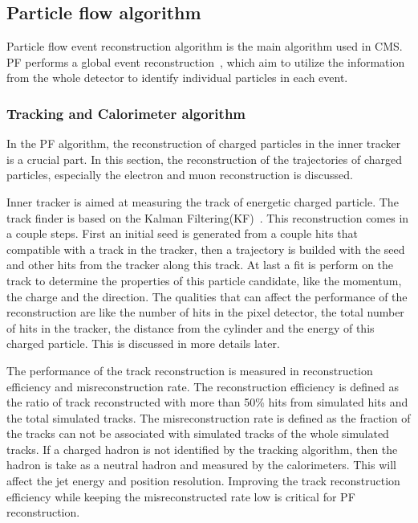 \subsection{Particle flow algorithm}

Particle flow event reconstruction algorithm is the main algorithm used in CMS. PF performs a global event reconstruction~\cite{CMS-PRF-14-001}, which aim to utilize the information from the whole detector to identify individual particles in each event.



\subsubsection{Tracking and Calorimeter algorithm}\label{PFtracker}

In the PF algorithm, the reconstruction of charged particles in the inner tracker is a crucial part. In this section, the reconstruction of the trajectories of charged particles, especially the electron and muon reconstruction is discussed. 

Inner tracker is aimed at measuring the track of energetic charged particle. The track finder is based on the Kalman Filtering(KF)~\cite{tracker:algo}. This reconstruction comes in a couple steps. First an initial seed is generated from a couple hits that compatible with a track in the tracker, then a trajectory is builded with the seed and other hits from the tracker along this track. At last a fit is perform on the track  to determine the properties of this particle candidate, like the momentum, the charge and the direction. The qualities that can affect the performance of the reconstruction are like the number of hits in the pixel detector, the total number of hits in the tracker, the distance from the cylinder and the energy of this charged particle. This is discussed in more details later.

The performance of the track reconstruction is measured in reconstruction efficiency and misreconstruction rate. The reconstruction efficiency is defined as the ratio of track reconstructed with more than 50\% hits from simulated hits and the total simulated tracks. The misreconstruction rate is defined as the fraction of the tracks can not be associated with simulated tracks of the whole simulated tracks.  If a charged hadron is not identified by the tracking algorithm, then the hadron is take as a neutral hadron and measured by the calorimeters. This will affect the jet energy and position resolution. Improving the track reconstruction efficiency while keeping the misreconstructed rate low is critical for PF reconstruction.

